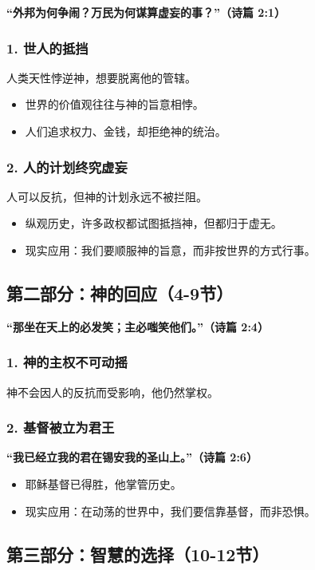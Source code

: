\documentclass[a4paper, 12pt]{article}
\begin{document}
\textbf{“外邦为何争闹？万民为何谋算虚妄的事？”（诗篇 2:1）}

\subsubsection*{1. 世人的抵挡}
人类天性悖逆神，想要脱离他的管辖。
\begin{itemize}
    \item 世界的价值观往往与神的旨意相悖。
    \item 人们追求权力、金钱，却拒绝神的统治。
\end{itemize}

\subsubsection*{2. 人的计划终究虚妄}
人可以反抗，但神的计划永远不被拦阻。
\begin{itemize}
    \item 纵观历史，许多政权都试图抵挡神，但都归于虚无。
    \item 现实应用：我们要顺服神的旨意，而非按世界的方式行事。
\end{itemize}

\subsection*{第二部分：神的回应（4-9节）}

\textbf{“那坐在天上的必发笑；主必嗤笑他们。”（诗篇 2:4）}

\subsubsection*{1. 神的主权不可动摇}
神不会因人的反抗而受影响，他仍然掌权。

\subsubsection*{2. 基督被立为君王}
\textbf{“我已经立我的君在锡安我的圣山上。”（诗篇 2:6）}

\begin{itemize}
    \item 耶稣基督已得胜，他掌管历史。
    \item 现实应用：在动荡的世界中，我们要信靠基督，而非恐惧。
\end{itemize}

\subsection*{第三部分：智慧的选择（10-12节）}
\end{document}
